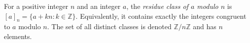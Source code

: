 
For a positive integer $n$ and an integer $a$, the \emph{residue class of $a$ modulo $n$} is $[a]_n=\{a+kn:k\in\mathbb Z\}$. Equivalently, it contains exactly the integers congruent to $a$ modulo $n$. The set of all distinct classes is denoted $\mathbb Z/n\mathbb Z$ and has $n$ elements.
